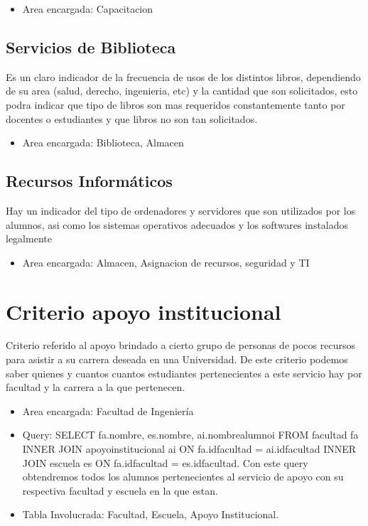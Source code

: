 \documentclass[12pt,a4paper]{report}
\begin{document}
\begin{itemize}
\item Area encargada: Capacitacion

\end{itemize}
\subsection{Servicios de Biblioteca}
Es un claro indicador de la frecuencia de usos de los distintos libros, dependiendo de su area (salud, derecho, ingenieria, etc) y la cantidad que son solicitados, esto podra indicar que tipo de libros son mas requeridos constantemente tanto por docentes o estudiantes y que libros no son tan solicitados.

\begin{itemize}
\item Area encargada: Biblioteca, Almacen

\end{itemize}
\subsection{Recursos Informáticos }
Hay un indicador del tipo de ordenadores y servidores que son utilizados por los alumnos,  asi como los sistemas operativos adecuados y los softwares instalados legalmente

\begin{itemize}
\item Area encargada: Almacen, Asignacion de recursos, seguridad y TI

\end{itemize}

\section{ Criterio apoyo institucional}
Criterio referido al apoyo brindado a cierto grupo de personas de pocos recursos para asistir a su carrera deseada en una Universidad. De este criterio podemos saber quienes y cuantos cuantos estudiantes pertenecientes a este servicio hay por facultad y la carrera a la que pertenecen.

\begin{itemize}
\item Area encargada: Facultad de Ingeniería

\item Query: SELECT fa.nombre, es.nombre, ai.nombrealumnoi  FROM facultad fa INNER JOIN apoyoinstitucional ai ON fa.idfacultad = ai.idfacultad INNER JOIN escuela es ON fa.idfacultad = es.idfacultad. Con este query obtendremos todos los alumnos pertenecientes al servicio de apoyo con su respectiva facultad y escuela en la que estan.

\item Tabla Involucrada: Facultad, Escuela, Apoyo Institucional.
\end{itemize}
\end{document}
